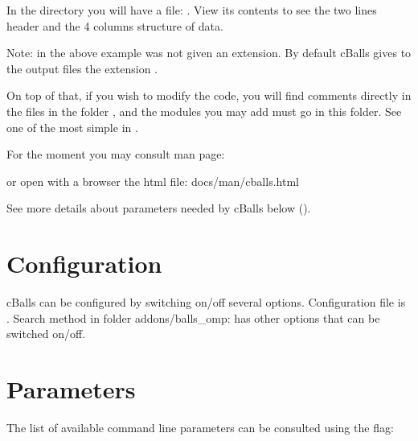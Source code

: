 \documentclass[letterpaper,10pt,english]{sphinxmanual}
\begin{document}
\sphinxAtStartPar
In the  directory you will have a file: . View its contents to see the two lines header and the 4 columns structure of data.

\sphinxAtStartPar
Note: in the above example  was not given an extension. By default cBalls gives to the output files the extension .

\sphinxAtStartPar
On top of that, if you wish to modify the code, you will find comments directly in the files in the folder , and the modules you may add must go in this folder. See one of the most simple in .

\sphinxAtStartPar
For the moment you may consult man page:

\begin{sphinxVerbatim}[commandchars=\\\{\}]
 
\end{sphinxVerbatim}

\sphinxAtStartPar
or open with a browser the html file: docs/man/cballs.html

\sphinxAtStartPar
See more details about parameters needed by cBalls below ({\hyperref[\detokenize{overview:parameters}]{}}).


\section{Configuration}
\label{\detokenize{overview:configuration}}
\sphinxAtStartPar
cBalls can be configured by switching on/off several options. Configuration file is . Search method  in folder addons/balls\_omp:  has other options that can be switched on/off.


\section{Parameters}
\label{\detokenize{overview:parameters}}\label{\detokenize{overview:id1}}
\sphinxAtStartPar
The list of available command line parameters can be consulted using the  flag:
\end{document}
